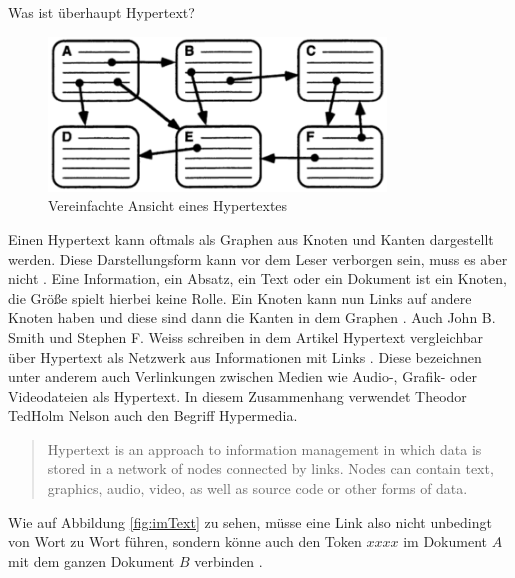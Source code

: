 \begin{section}{Was ist überhaupt Hypertext?}
\begin{figure}[H]
	\centering
	\includegraphics[width=0.8\textwidth]{image/nielsenLink}
	\caption{Vereinfachte Ansicht eines Hypertextes \cite[S.1]{Nielsen1995}}
	\label{fig:nielsenLink}
\end{figure}


Einen Hypertext kann oftmals als Graphen aus Knoten und Kanten dargestellt werden. Diese Darstellungsform kann vor dem Leser verborgen sein, muss es aber nicht \cite{Conklin1987}. Eine Information, ein Absatz, ein Text oder ein Dokument ist ein Knoten, die Größe spielt hierbei keine Rolle. Ein Knoten kann nun Links auf andere Knoten haben und diese sind dann die Kanten in dem Graphen \cite[S.19]{Conklin1987} \cite[S.2]{Nielsen1995}. Auch John B. Smith und Stephen F. Weiss schreiben in dem Artikel Hypertext vergleichbar über Hypertext als Netzwerk aus Informationen mit Links \cite{Smith1988}. Diese bezeichnen unter anderem auch Verlinkungen zwischen Medien wie Audio-, Grafik- oder Videodateien als Hypertext. In diesem Zusammenhang verwendet Theodor \glqq Ted\grqq{ }Holm Nelson auch den Begriff \glqq Hypermedia\grqq{ }\cite{Nelson1965}.

\begin{quote}
    \glqq [...] Hypertext is an approach to information management in which data is stored in a network of nodes connected by links. Nodes can contain text, graphics, audio, video, as well as source code or other forms of data.\grqq{ }\cite{Smith1988}
\end{quote}

Wie auf Abbildung \ref{fig:imText} zu sehen, müsse eine Link also nicht unbedingt von Wort zu Wort führen, sondern könne auch den Token $xxxx$ im Dokument $A$ mit dem ganzen Dokument $B$ verbinden \cite{Conklin1987}. 


\end{section}
